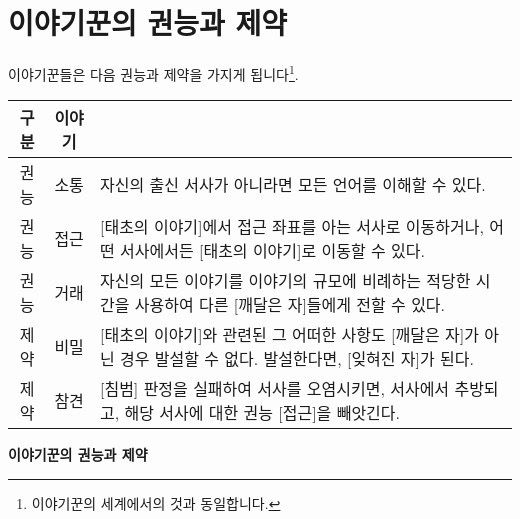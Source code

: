 \documentclass{report}
\begin{document}
	\hypertarget{ability-limit}{}
	\section*{이야기꾼의 권능과 제약}
	이야기꾼들은 다음 권능과 제약을 가지게 됩니다\footnote{이야기꾼의 세계에서의 것과 동일합니다.}.
	
	\smallskip
	
	\begin{minipage}{\textwidth}
		\begin{tabularx}{\textwidth}{c!{\color{black}\vrule}c!{\color{black}\vrule}X}
			\hline
			\textbf{구분} & \textbf{이야기} &  \\ \hline \hline
			권능 & 소통 & 자신의 출신 서사가 아니라면 모든 언어를 이해할 수 있다. \\ \hline
			권능 & 접근 & [태초의 이야기]에서 접근 좌표를 아는 서사로 이동하거나, 어떤 서사에서든 [태초의 이야기]로 이동할 수 있다. \\ \hline
			권능 & 거래 & 자신의 모든 이야기를 이야기의 규모에 비례하는 적당한 시간을 사용하여 다른 [깨달은 자]들에게 전할 수 있다. \\ \hline
			제약 & 비밀 & [태초의 이야기]와 관련된 그 어떠한 사항도 [깨달은 자]가 아닌 경우 발설할 수 없다. 발설한다면, [잊혀진 자]가 된다. \\ \hline
			제약 & 참견 & [침범] 판정을 실패하여 서사를 오염시키면, 서사에서 추방되고, 해당 서사에 대한 권능 [접근]을 빼앗긴다. \\\hline
		\end{tabularx}
		
		\smallskip
		
		\begin{tightcenter}
			\textbf{이야기꾼의 권능과 제약}
		\end{tightcenter}
	\end{minipage}
	
\end{document}
